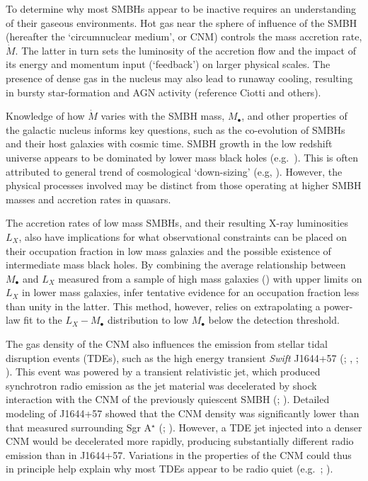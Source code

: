 \documentclass[usenatbib,fleqn]{mn2e}
\newcommand{\Mbh}[1][]{M_{\bullet#1}}
\begin{document}
To determine why most SMBHs appear to be inactive requires an understanding of their gaseous environments.  Hot gas near the sphere of influence of the SMBH (hereafter the `circumnuclear medium', or CNM) controls the mass accretion rate, $\dot{M}$.  The latter in turn sets the luminosity of the accretion flow and the impact of its energy and momentum input (`feedback') on larger physical scales.  The presence of dense gas in the nucleus may also lead to runaway cooling, resulting in bursty star-formation and AGN activity (reference Ciotti and others).

Knowledge of how $\dot{M}$ varies with the SMBH mass, $\Mbh$, and other properties of the
galactic nucleus informs key questions, such as the co-evolution of SMBHs and their host galaxies with cosmic time.  SMBH growth in the low redshift universe appears to be dominated by lower mass black holes (e.g.~\citealt{Heckman+04}).  This is often
attributed to general trend  of cosmological `down-sizing' (e.g, \citealt{Gallo+08}).  However, the physical processes involved may be distinct from those operating at higher SMBH masses and accretion rates in quasars.

The accretion rates of low mass SMBHs, and their resulting X-ray luminosities $L_X$, also have implications for what observational constraints can be placed on their occupation fraction in low mass galaxies and the possible existence of intermediate mass black holes.  By combining the average relationship between $\Mbh$ and
$L_X$ measured from a sample of high mass galaxies (\citealt{Gallo+08}) with upper limits on $L_X$ in lower mass
galaxies, \citet{MillerGallo+:2014a}  infer tentative evidence for an occupation fraction less than unity in the latter.  This method, however, relies on extrapolating a power-law fit to the $L_X-\Mbh$ distribution to low $\Mbh$ below the detection threshold.  


The gas density of the CNM also influences the emission from stellar tidal disruption events (TDEs), such as the high energy
transient {\it Swift} J1644+57 (\citealt{Levan+11}; \citealt{Bloom+11}, \citealt{Burrows+11}; \citealt{Zauderer+11}).
This event was powered by a transient relativistic jet, which produced
synchrotron radio emission as the jet material was decelerated by
shock interaction with the CNM of the previously quiescent SMBH
(\citealt{Giannios&Metzger11}; \citealt{Zauderer+11}).  Detailed
modeling of J1644+57 showed that the CNM density was
significantly lower than that measured surrounding Sgr A$^{\star}$
(\citealt{Metzger+12}; \citealt{Berger+12}).  However, a TDE jet
injected into a denser CNM would be decelerated more rapidly,
producing substantially different radio emission than in J1644+57.  Variations in the properties of the CNM could thus in
principle help explain why most TDEs appear to be radio quiet
(e.g.~\citealt{Bower+13}; \citealt{VanVelzen+13}).
\end{document}
